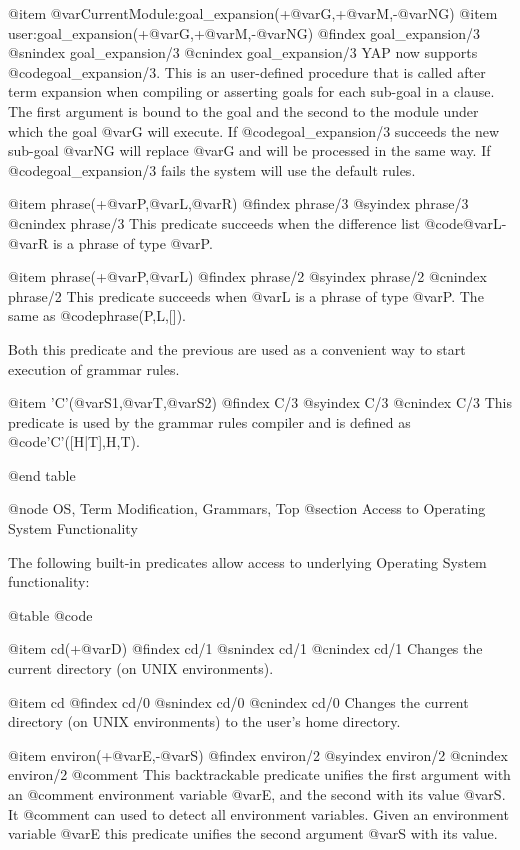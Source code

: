 {{{{{{@item @var{CurrentModule}:goal_expansion(+@var{G},+@var{M},-@var{NG})
@item user:goal_expansion(+@var{G},+@var{M},-@var{NG})
@findex goal_expansion/3
@snindex goal_expansion/3
@cnindex goal_expansion/3
YAP now supports @code{goal_expansion/3}. This is an user-defined
procedure that is called after term expansion when compiling or
asserting goals for each sub-goal in a clause. The first argument is
bound to the goal and the second to the module under which the goal
@var{G} will execute. If @code{goal_expansion/3} succeeds the new
sub-goal @var{NG} will replace @var{G} and will be processed in the same
way. If @code{goal_expansion/3} fails the system will use the default
rules.

@item phrase(+@var{P},@var{L},@var{R})
@findex phrase/3
@syindex phrase/3
@cnindex phrase/3
This predicate succeeds when the difference list @code{@var{L}-@var{R}}
is a phrase of type @var{P}.

@item phrase(+@var{P},@var{L})
@findex phrase/2
@syindex phrase/2
@cnindex phrase/2
This predicate succeeds when @var{L} is a phrase of type @var{P}. The
same as @code{phrase(P,L,[])}.

Both this predicate and the previous are used as a convenient way to
start execution of grammar rules.

@item 'C'(@var{S1},@var{T},@var{S2})
@findex C/3
@syindex C/3
@cnindex C/3
This predicate is used by the grammar rules compiler and is defined as
@code{'C'([H|T],H,T)}.

@end table

@node OS, Term Modification, Grammars, Top
@section Access to Operating System Functionality

The following built-in predicates allow access to underlying
Operating System functionality: 

@table @code

@item cd(+@var{D})
@findex cd/1
@snindex cd/1
@cnindex cd/1
Changes the current directory (on UNIX environments).

@item cd
@findex cd/0
@snindex cd/0
@cnindex cd/0
Changes the current directory (on UNIX environments) to the user's home directory.

@item environ(+@var{E},-@var{S})
@findex environ/2
@syindex environ/2
@cnindex environ/2
@comment This backtrackable predicate unifies the first argument with an
@comment environment variable @var{E}, and the second with its value @var{S}. It
@comment can used to detect all environment variables.
    Given an environment variable @var{E} this predicate unifies the second argument @var{S} with its value.

}}}}}}
